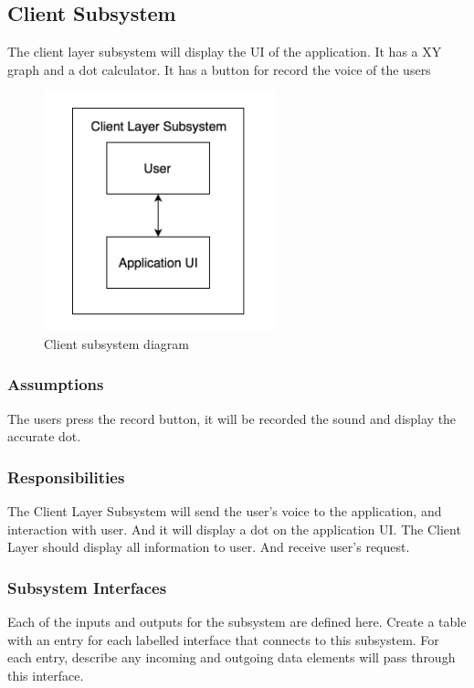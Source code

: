 \subsection{Client Subsystem}
The client layer subsystem will display the UI of the application. 
It has a XY graph and a dot calculator.
It has a button for record the voice of the users

\begin{figure}[h!]
	\centering
 	\includegraphics[width=0.60\textwidth]{images/subsystem_client}
 \caption{Client subsystem diagram}
\end{figure}

\subsubsection{Assumptions}
The users press the record button, it will be recorded the sound and display the accurate dot.

\subsubsection{Responsibilities}
The Client Layer Subsystem will send the user's voice to the application, and interaction with user. And it will display a dot on the application UI.
The Client Layer should display all information to user. And receive user's request.

\subsubsection{Subsystem Interfaces}
Each of the inputs and outputs for the subsystem are defined here. Create a table with an entry for each labelled interface that connects to this subsystem. For each entry, describe any incoming and outgoing data elements will pass through this interface.

